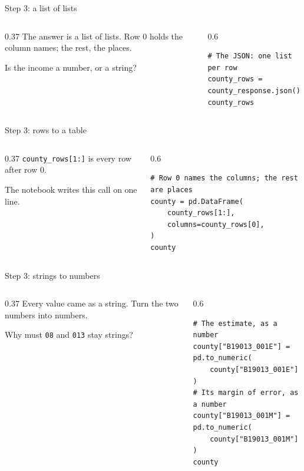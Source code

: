 \documentclass[9pt,aspectratio=169]{beamer}
\begin{document}
\begin{frame}[fragile]{Step 3: a list of lists}
    \begin{columns}[T]
        \begin{column}{0.37\textwidth}
            The answer is a list of lists. Row 0 holds the column names; the rest, the places.

            \medskip
            Is the income a number, or a string?
        \end{column}
        \begin{column}{0.6\textwidth}
\begin{lstlisting}
# The JSON: one list per row
county_rows = county_response.json()
county_rows
\end{lstlisting}
        \end{column}
    \end{columns}
\end{frame}

\begin{frame}[fragile]{Step 3: rows to a table}
    \begin{columns}[T]
        \begin{column}{0.37\textwidth}
            \texttt{county\_rows[1:]} is every row after row 0.

            \medskip
            The notebook writes this call on one line.
        \end{column}
        \begin{column}{0.6\textwidth}
\begin{lstlisting}
# Row 0 names the columns; the rest are places
county = pd.DataFrame(
    county_rows[1:],
    columns=county_rows[0],
)
county
\end{lstlisting}
        \end{column}
    \end{columns}
\end{frame}

\begin{frame}[fragile]{Step 3: strings to numbers}
    \begin{columns}[T]
        \begin{column}{0.37\textwidth}
            Every value came as a string. Turn the two numbers into numbers.

            \medskip
            Why must \texttt{08} and \texttt{013} stay strings?
        \end{column}
        \begin{column}{0.6\textwidth}
\begin{lstlisting}
# The estimate, as a number
county["B19013_001E"] = pd.to_numeric(
    county["B19013_001E"]
)
# Its margin of error, as a number
county["B19013_001M"] = pd.to_numeric(
    county["B19013_001M"]
)
county
\end{lstlisting}
        \end{column}
    \end{columns}
\end{frame}
\end{document}
